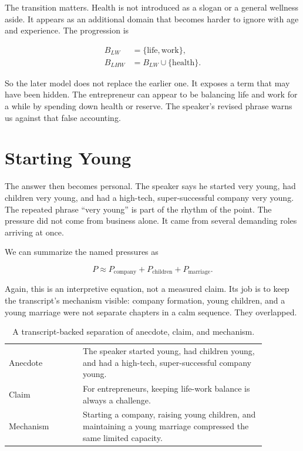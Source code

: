 The transition matters. Health is not introduced as a slogan or a general wellness aside. It appears as an additional domain that becomes harder to ignore with age and experience. The progression is

\begin{align}
B_{LW} &= \{\text{life},\text{work}\},\\
B_{LHW} &= B_{LW}\cup\{\text{health}\}.
\end{align}

So the later model does not replace the earlier one. It exposes a term that may have been hidden. The entrepreneur can appear to be balancing life and work for a while by spending down health or reserve. The speaker's revised phrase warns us against that false accounting.

\section{Starting Young}

The answer then becomes personal. The speaker says he started very young, had children very young, and had a high-tech, super-successful company very young. The repeated phrase ``very young'' is part of the rhythm of the point. The pressure did not come from business alone. It came from several demanding roles arriving at once.

We can summarize the named pressures as

\begin{equation}
P
\approx
P_{\text{company}}
+
P_{\text{children}}
+
P_{\text{marriage}}.
\end{equation}

Again, this is an interpretive equation, not a measured claim. Its job is to keep the transcript's mechanism visible: company formation, young children, and a young marriage were not separate chapters in a calm sequence. They overlapped.

\begin{table}
\centering
\begin{tabular}{p{0.25\linewidth} p{0.62\linewidth}}
\hline
Anecdote & The speaker started young, had children young, and had a high-tech, super-successful company young.\\
Claim & For entrepreneurs, keeping life-work balance is always a challenge.\\
Mechanism & Starting a company, raising young children, and maintaining a young marriage compressed the same limited capacity.\\
\hline
\end{tabular}
\caption{A transcript-backed separation of anecdote, claim, and mechanism.}
\end{table}

